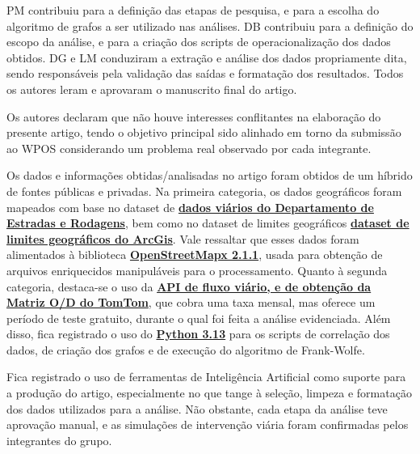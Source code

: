 \documentclass[portuguese]{sbc2025}%
\begin{document}
\begin{declarations}

\begin{contributions}
PM contribuiu para a definição das etapas de pesquisa, e para a escolha do algoritmo de grafos a ser utilizado nas análises. DB contribuiu para a definição do escopo da análise, e para a criação dos scripts de operacionalização dos dados obtidos. DG e LM conduziram a extração e análise dos dados propriamente dita, sendo responsáveis pela validação das saídas e formatação dos resultados. Todos os autores leram e aprovaram o manuscrito final do artigo.
\end{contributions}

\begin{interests}
Os autores declaram que não houve interesses conflitantes na elaboração do presente artigo, tendo o objetivo principal sido alinhado em torno da submissão ao WPOS considerando um problema real observado por cada integrante.
\end{interests}

\begin{materials}
Os dados e informações obtidas/analisadas no artigo foram obtidos de um híbrido de fontes públicas e privadas. Na primeira categoria, os dados geográficos foram mapeados com base no dataset de \textbf{\href{https://www.dados.df.gov.br/pt/inicio}{dados viários do Departamento de Estradas e Rodagens}}, bem como no dataset de limites geográficos \textbf{\href{https://geo-df-der.hub.arcgis.com/pages/downloads}{dataset de limites geográficos do ArcGis}}. Vale ressaltar que esses dados foram alimentados à biblioteca \textbf{\href{https://osmnx.readthedocs.io/en/stable/}{OpenStreetMapx 2.1.1}}, usada para obtenção de arquivos enriquecidos manipuláveis para o processamento. Quanto à segunda categoria, destaca-se o uso da \textbf{\href{https://www.tomtom.com/products/traffic-apis/}{API de fluxo viário, e de obtenção da Matriz O/D do TomTom}}, que cobra uma taxa mensal, mas oferece um período de teste gratuito, durante o qual foi feita a análise evidenciada. Além disso, fica registrado o uso do \textbf{\href{https://www.python.org}{Python 3.13}} para os scripts de correlação dos dados, de criação dos grafos e de execução do algoritmo de Frank-Wolfe.
\end{materials}

\begin{furtherinformation}
Fica registrado o uso de ferramentas de Inteligência Artificial como suporte para a produção do artigo, especialmente no que tange à seleção, limpeza e formatação dos dados utilizados para a análise. Não obstante, cada etapa da análise teve aprovação manual, e as simulações de intervenção viária foram confirmadas pelos integrantes do grupo.

\end{furtherinformation}

\end{declarations}
\end{document}
